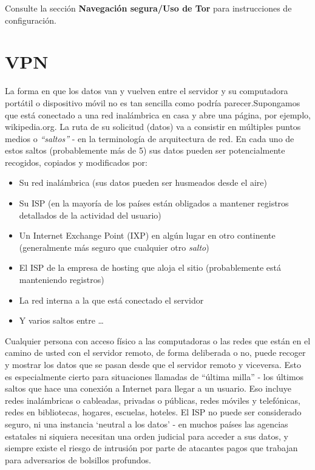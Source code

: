 \documentclass[10pt,a5paper,twoside,,]{book}
\providecommand{\tightlist}{%
  \setlength{\itemsep}{0pt}\setlength{\parskip}{0pt}}
\begin{document}
Consulte la sección \textbf{Navegación segura/Uso de Tor} para
instrucciones de configuración.

\chapter{VPN}\label{vpn}

La forma en que los datos van y vuelven entre el servidor y su
computadora portátil o dispositivo móvil no es tan sencilla como podría
parecer.Supongamos que está conectado a una red inalámbrica en casa y
abre una página, por ejemplo, wikipedia.org. La ruta de su solicitud
(datos) va a consistir en múltiples puntos medios o \emph{``saltos''} -
en la terminología de arquitectura de red. En cada uno de estos saltos
(probablemente más de 5) sus datos pueden ser potencialmente recogidos,
copiados y modificados por:

\begin{itemize}
\tightlist
\item
  Su red inalámbrica (sus datos pueden ser husmeados desde el aire)
\item
  Su ISP (en la mayoría de los países están obligados a mantener
  registros detallados de la actividad del usuario)
\item
  Un Internet Exchange Point (IXP) en algún lugar en otro continente
  (generalmente más seguro que cualquier otro \emph{salto})
\item
  El ISP de la empresa de hosting que aloja el sitio (probablemente está
  manteniendo registros)
\item
  La red interna a la que está conectado el servidor
\item
  Y varios saltos entre \ldots{}
\end{itemize}

Cualquier persona con acceso físico a las computadoras o las redes que
están en el camino de usted con el servidor remoto, de forma deliberada
o no, puede recoger y mostrar los datos que se pasan desde que el
servidor remoto y viceversa. Esto es especialmente cierto para
situaciones llamadas de ``última milla'' - los últimos saltos que hace
una conexión a Internet para llegar a un usuario. Eso incluye redes
inalámbricas o cableadas, privadas o públicas, redes móviles y
telefónicas, redes en bibliotecas, hogares, escuelas, hoteles. El ISP no
puede ser considerado seguro, ni una instancia `neutral a los datos' -
en muchos países las agencias estatales ni siquiera necesitan una orden
judicial para acceder a sus datos, y siempre existe el riesgo de
intrusión por parte de atacantes pagos que trabajan para adversarios de
bolsillos profundos.
\end{document}
